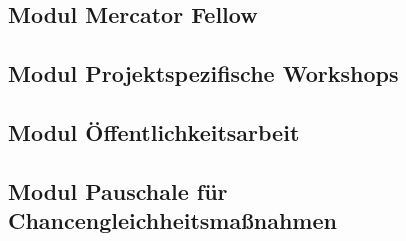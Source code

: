 \documentclass[de]{dfg-proposal}
\begin{document}
        \subsection{Modul Mercator Fellow}

        \subsection{Modul Projektspezifische Workshops}

        \subsection{Modul Öffentlichkeitsarbeit}

        \subsection{Modul Pauschale für Chancengleichheitsmaßnahmen}
\end{document}
